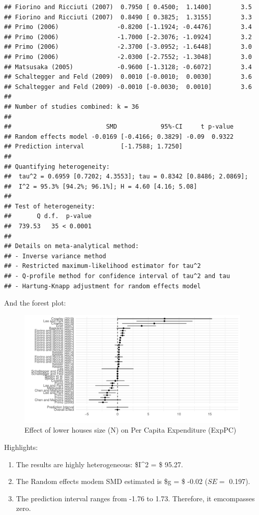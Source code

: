 \documentclass[
]{article}
\providecommand{\tightlist}{%
  \setlength{\itemsep}{0pt}\setlength{\parskip}{0pt}}
\begin{document}
\begin{verbatim}
## Fiorino and Ricciuti (2007)  0.7950 [ 0.4500;  1.1400]        3.5
## Fiorino and Ricciuti (2007)  0.8490 [ 0.3825;  1.3155]        3.3
## Primo (2006)                -0.8200 [-1.1924; -0.4476]        3.4
## Primo (2006)                -1.7000 [-2.3076; -1.0924]        3.2
## Primo (2006)                -2.3700 [-3.0952; -1.6448]        3.0
## Primo (2006)                -2.0300 [-2.7552; -1.3048]        3.0
## Matsusaka (2005)            -0.9600 [-1.3128; -0.6072]        3.4
## Schaltegger and Feld (2009)  0.0010 [-0.0010;  0.0030]        3.6
## Schaltegger and Feld (2009) -0.0010 [-0.0030;  0.0010]        3.6
## 
## Number of studies combined: k = 36
## 
##                          SMD            95%-CI     t p-value
## Random effects model -0.0169 [-0.4166; 0.3829] -0.09  0.9322
## Prediction interval          [-1.7588; 1.7250]              
## 
## Quantifying heterogeneity:
##  tau^2 = 0.6959 [0.7202; 4.3553]; tau = 0.8342 [0.8486; 2.0869];
##  I^2 = 95.3% [94.2%; 96.1%]; H = 4.60 [4.16; 5.08]
## 
## Test of heterogeneity:
##       Q d.f.  p-value
##  739.53   35 < 0.0001
## 
## Details on meta-analytical method:
## - Inverse variance method
## - Restricted maximum-likelihood estimator for tau^2
## - Q-profile method for confidence interval of tau^2 and tau
## - Hartung-Knapp adjustment for random effects model
\end{verbatim}

And the forest plot:

\begin{figure}
\centering
\includegraphics{appendixV5_files/figure-latex/unnamed-chunk-32-1.pdf}
\caption{Effect of lower houses size (N) on Per Capita Expenditure
(ExpPC)}
\end{figure}

Highlights:

\begin{enumerate}
\def\labelenumi{\arabic{enumi}.}
\tightlist
\item
  The results are highly heterogeneous: \$I\^{}2 = \$ 95.27.
\item
  The Random effects modem SMD estimated is \$g = \$ -0.02 (\(SE =\)
  0.197).
\item
  The prediction interval ranges from -1.76 to 1.73. Therefore, it
  emcompasses zero.
\end{enumerate}
\end{document}
